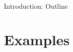 \newcommand{\myinput}[1]{
\ifx\inlibrary\undefined
  
\else
  
\fi
}

\myinput{ezasp/macros}
\myinput{ezasp/summary}
\myinput{ezasp/motivation}
\begin{frame}{Introduction: Outline}
  \medskip
  \tableofcontents
\end{frame}
\section{Examples}
\myinput{ezasp/example1}
%
%
%
%
